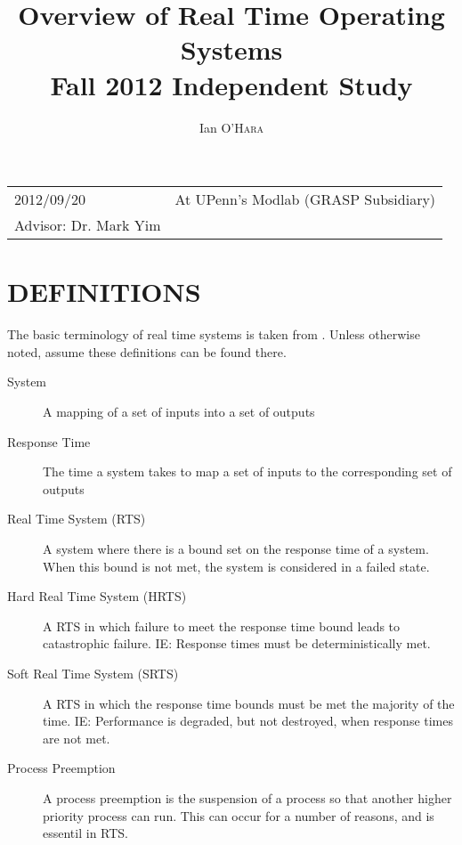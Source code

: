\documentclass{article}
\title{Overview of Real Time Operating Systems \\ Fall 2012 Independent Study} %
\author{Ian \textsc{O'Hara}} %
\begin{document}
\maketitle %

\begin{tabular}{lr}
2012/09/20 & At UPenn's Modlab (GRASP Subsidiary)\\ %
Advisor: Dr. Mark Yim %
\end{tabular}

\setlength\parindent{0pt} %

\renewcommand{\labelenumi}{\alph{enumi}.} %

\newcommand{\TODO}[1]{ {\bf \textcolor{red}{TODO:} #1 }}

\section{DEFINITIONS}
The basic terminology of real time systems is taken from \cite{Laplante}.  Unless otherwise noted, assume these definitions can be found there.
\begin{description}
\item[System]{A mapping of a set of inputs into a set of outputs}
\item[Response Time]{The time a system takes to map a set of inputs to the corresponding set of outputs}
\item[Real Time System (RTS)]{A system where there is a bound set on the response time of a system.  When this bound is not met, the system is considered in a failed state.}
\item[Hard Real Time System (HRTS)]{A RTS in which failure to meet the response time bound leads to catastrophic failure.  IE: Response times must be deterministically met.}
\item[Soft Real Time System (SRTS)]{A RTS in which the response time bounds must be met the majority of the time. IE: Performance is degraded, but not destroyed, when response times are not met.}
\item[Process Preemption]{A process preemption is the suspension of a process so that another higher priority process can run.  This can occur for a number of reasons, and is essentil in RTS.}
\end{description}
\end{document}
